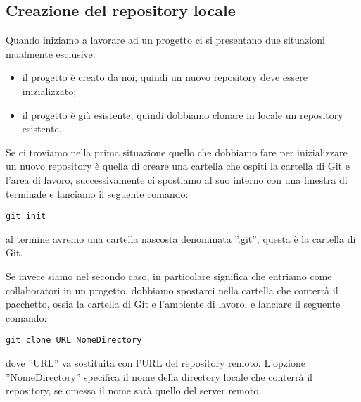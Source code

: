 \subsection{Creazione del repository locale}
Quando iniziamo a lavorare ad un progetto ci si presentano due situazioni mualmente esclusive:

\begin{itemize}
\item il progetto è creato da noi, quindi un nuovo repository deve essere inizializzato;
\item il progetto è già esistente, quindi dobbiamo clonare in locale un repository esistente.
\end{itemize}

Se ci troviamo nella prima situazione quello che dobbiamo fare per inizializzare un nuovo repository è quella di creare una cartella che ospiti la cartella di Git e l'area di lavoro, successivamente ci spostiamo al suo interno con una finestra di terminale e lanciamo il seguente comando:

\begin{center}
\texttt{git init}
\end{center}

al termine avremo una cartella nascosta denominata ''.git'', questa è la cartella di Git.

Se invece siamo nel secondo caso, in particolare significa che entriamo come collaboratori in un progetto, dobbiamo spostarci nella cartella che conterrà il pacchetto, ossia la cartella di Git e l'ambiente di lavoro, e lanciare il seguente comando:

\begin{center}
\texttt{git clone URL NomeDirectory}
\end{center}

dove ''URL'' va sostituita con l'URL del repository remoto. L'opzione ''NomeDirectory'' specifica il nome della directory locale che conterrà il repository, se omessa il nome sarà quello del server remoto.
